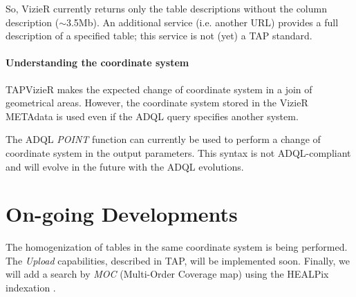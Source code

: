 So, VizieR currently returns only the table descriptions without the column description ($\sim$3.5Mb). An additional service (i.e. another URL) provides a full description of a specified table; this service is not (yet) a TAP standard.

\paragraph{Understanding the coordinate system}

TAPVizieR makes the expected change of coordinate system in a join of geometrical  areas. However, the coordinate system stored in the VizieR METAdata is used even if the ADQL query specifies another system.

The ADQL {\em POINT} function can currently be used to perform a change of coordinate system in the output parameters. This syntax is not ADQL-compliant and  will evolve in the future with the ADQL evolutions.

\section{On-going Developments}

The homogenization of tables in the same coordinate system is being performed. The {\em Upload} capabilities, described in TAP, will be implemented soon. Finally, we will add a search by {\em MOC}  (Multi-Order Coverage map) using the HEALPix indexation \citep{O13_adassxxii}.


